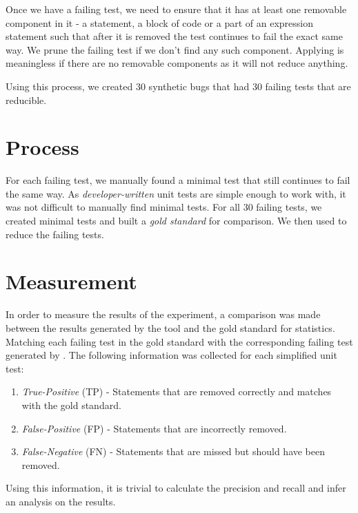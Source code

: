 Once we have a failing test, we need to ensure that it has at least one removable component in it - a statement, a block of code or a part of an expression statement such that after it is removed the test continues to fail the exact same way. We prune the failing test if we don't find any such component. Applying \mytool is meaningless if there are no removable components as it will not reduce anything.  

Using this process, we created 30 synthetic bugs that had 30 failing tests that are reducible.  

\section{Process}
For each failing test, we manually found a minimal test that still continues to fail the same way. As \emph{developer-written} unit tests are simple enough to work with, it was not difficult to manually find minimal tests. For all 30 failing tests, we created minimal tests and built a \emph{gold standard} for comparison.
We then used \mytool to reduce the failing tests.

\section{Measurement}
In order to measure the results of the experiment, a comparison was made between the results generated by the tool and the gold standard for statistics. Matching each failing test in the gold standard with the corresponding failing test generated by \mytool. The following information was collected for each simplified unit test: 
\begin{enumerate}
    \item\emph{True-Positive} (TP) - Statements that are removed correctly and matches with the gold standard. 
    \item \emph{False-Positive} (FP) - Statements that are incorrectly removed. 
    \item \emph{False-Negative} (FN) - Statements that are missed but should have been removed. 
\end{enumerate}

Using this information, it is trivial to calculate the precision and recall and infer an analysis on the results.



